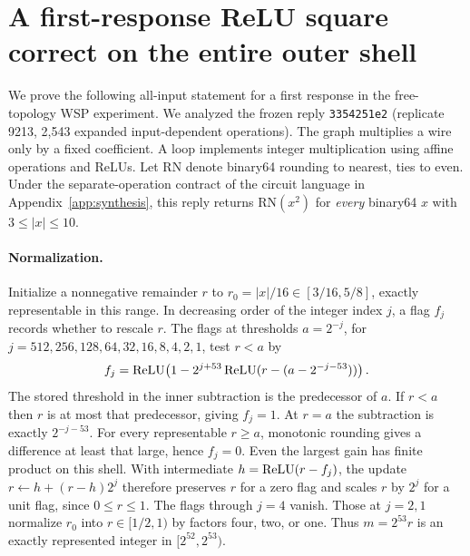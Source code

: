 \section{A first-response ReLU square correct on the entire outer shell}
\label{app:literal-square-certificate}
We prove the following all-input statement for a first response in the free-topology WSP experiment. We analyzed the frozen reply \texttt{3354251e2} (replicate 9213, 2,543 expanded input-dependent operations). The graph multiplies a wire only by a fixed coefficient. A loop implements integer multiplication using affine operations and ReLUs. Let $\mathrm{RN}$ denote binary64 rounding to nearest, ties to even. Under the separate-operation contract of the circuit language in Appendix~\ref{app:synthesis}, this reply returns $\mathrm{RN}(x^2)$ for \emph{every} binary64 $x$ with $3\le |x|\le10$.

\paragraph{Normalization.}
Initialize a nonnegative remainder $r$ to $r_0=|x|/16\in[3/16,5/8]$, exactly representable in this range. In decreasing order of the integer index $j$, a flag $f_j$ records whether to rescale $r$. The flags at thresholds $a=2^{-j}$, for $j=512,256,128,64,32,16,8,4,2,1$, test $r<a$ by
\[
 f_j=\operatorname{ReLU}\!\left(1-2^{j+53}\operatorname{ReLU}(r-(a-2^{-j-53}))\right).
\]
The stored threshold in the inner subtraction is the predecessor of $a$. If $r<a$ then $r$ is at most that predecessor, giving $f_j=1$. At $r=a$ the subtraction is exactly $2^{-j-53}$. For every representable $r\ge a$, monotonic rounding gives a difference at least that large, hence $f_j=0$. Even the largest gain has finite product on this shell. With intermediate $h=\operatorname{ReLU}(r-f_j)$, the update $r\gets h+(r-h)2^j$ therefore preserves $r$ for a zero flag and scales $r$ by $2^j$ for a unit flag, since $0\le r\le1$. The flags through $j=4$ vanish. Those at $j=2,1$ normalize $r_0$ into $r\in[1/2,1)$ by factors four, two, or one. Thus $m=2^{53}r$ is an exactly represented integer in $[2^{52},2^{53})$.

